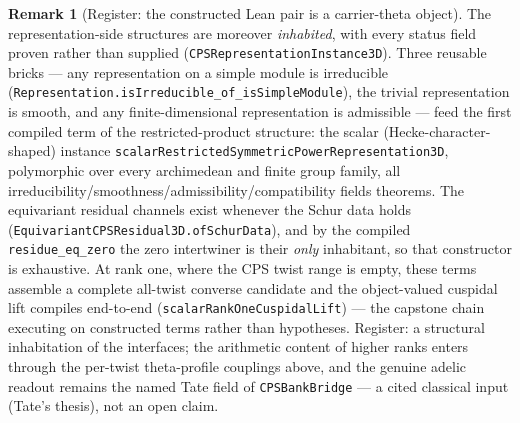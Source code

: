 \documentclass[11pt]{article}
\theoremstyle{definition}
\newtheorem{remark}[theorem]{Remark}
\begin{document}
\begin{remark}[Register: the constructed Lean pair is a carrier-theta object]
The representation-side structures are moreover \emph{inhabited}, with every status field proven
rather than supplied (\texttt{CPSRepresentationInstance3D}).  Three reusable bricks --- any
representation on a simple module is irreducible
(\texttt{Representation.isIrreducible\_of\_isSimpleModule}), the trivial representation is
smooth, and any finite-dimensional representation is admissible --- feed the first compiled term
of the restricted-product structure: the scalar (Hecke-character-shaped) instance
\texttt{scalarRestrictedSymmetricPowerRepresentation3D}, polymorphic over every archimedean and
finite group family, all irreducibility/smoothness/admissibility/compatibility fields theorems.
The equivariant residual channels exist whenever the Schur data holds
(\texttt{EquivariantCPSResidual3D.ofSchurData}), and by the compiled
\texttt{residue\_eq\_zero} the zero intertwiner is their \emph{only} inhabitant, so that
constructor is exhaustive.  At rank one, where the CPS twist range is empty, these terms
assemble a complete all-twist converse candidate and the object-valued cuspidal lift compiles
end-to-end (\texttt{scalarRankOneCuspidalLift}) --- the capstone chain executing on constructed
terms rather than hypotheses.  Register: a structural inhabitation of the interfaces; the
arithmetic content of higher ranks enters through the per-twist theta-profile couplings above,
and the genuine adelic readout remains the named Tate field of \texttt{CPSBankBridge} --- a
cited classical input (Tate's thesis), not an open claim.


\end{remark}
\end{document}
